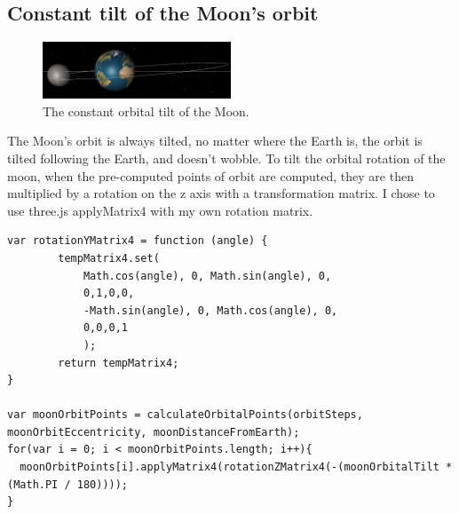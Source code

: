 \documentclass[12pt]{article}
\begin{document}
\subsection{Constant tilt of the Moon's orbit}
\begin{figure}[H]
        \centering
       
                \includegraphics[width=0.5\textwidth]{images/moonorbittilt2}
                \caption{The constant orbital tilt of the Moon.}
                \label{fig: The constant orbital tilt of the Moon.}
      
\end{figure}

The Moon's orbit is always tilted, no matter where the Earth is, the orbit is tilted following the Earth, and doesn't wobble. To tilt the orbital rotation of the moon, when the pre-computed points of orbit are computed, they are then multiplied by a rotation on the z axis with a transformation matrix. I chose to use three.js applyMatrix4 with my own rotation matrix.
\begin{lstlisting}
var rotationYMatrix4 = function (angle) {     
        tempMatrix4.set(
            Math.cos(angle), 0, Math.sin(angle), 0,
            0,1,0,0,
            -Math.sin(angle), 0, Math.cos(angle), 0,
            0,0,0,1
            );
        return tempMatrix4;
}

var moonOrbitPoints = calculateOrbitalPoints(orbitSteps, moonOrbitEccentricity, moonDistanceFromEarth);
for(var i = 0; i < moonOrbitPoints.length; i++){
  moonOrbitPoints[i].applyMatrix4(rotationZMatrix4(-(moonOrbitalTilt * (Math.PI / 180))));
}
\end{lstlisting}
\end{document}
